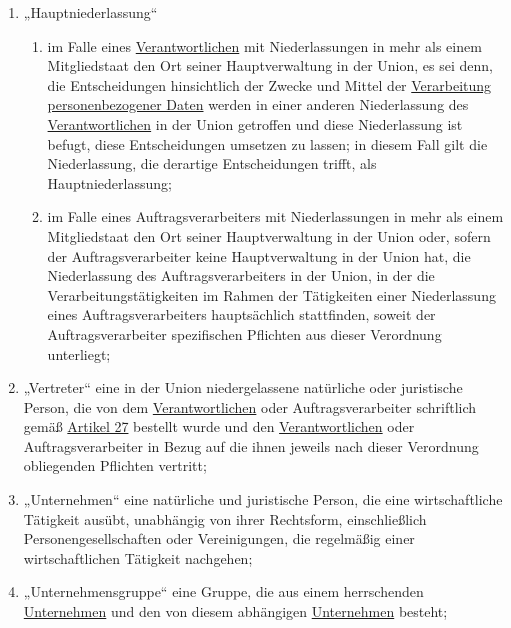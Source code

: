 \begin{enumerate}
  \item „Hauptniederlassung“
  \label{itm:04-16}

  \begin{enumerate}
  
    \item im Falle eines \hyperref[itm:04-7]{Verantwortlichen} mit Niederlassungen in mehr als einem Mitgliedstaat den Ort seiner
     Hauptverwaltung in der Union, es sei denn, die Entscheidungen hinsichtlich der Zwecke und Mittel der \hyperref[itm:04-2]{Verarbeitung}
     \hyperref[itm:04-1]{personenbezogener Daten} werden in einer anderen Niederlassung des \hyperref[itm:04-7]{Verantwortlichen} in der Union getroffen und
     diese Niederlassung ist befugt, diese Entscheidungen umsetzen zu lassen; in diesem Fall gilt die Niederlassung,
     die derartige Entscheidungen trifft, als Hauptniederlassung;
    \label{itm:04-16a}

    \item im Falle eines Auftragsverarbeiters mit Niederlassungen in mehr als einem Mitgliedstaat den Ort seiner
     Hauptverwaltung in der Union oder, sofern der Auftragsverarbeiter keine Hauptverwaltung in der Union hat, die
     Niederlassung des Auftragsverarbeiters in der Union, in der die Verarbeitungstätigkeiten im Rahmen der Tätigkeiten
     einer Niederlassung eines Auftragsverarbeiters hauptsächlich stattfinden, soweit der Auftragsverarbeiter
     spezifischen Pflichten aus dieser Verordnung unterliegt;
    \label{itm:04-16b}

  \end{enumerate}

  \item „Vertreter“ eine in der Union niedergelassene natürliche oder juristische Person, die von dem \hyperref[itm:04-7]{Verantwortlichen}
   oder Auftragsverarbeiter schriftlich gemäß \hyperref[ch:27]{Artikel 27} bestellt wurde und den \hyperref[itm:04-7]{Verantwortlichen} oder
   Auftragsverarbeiter in Bezug auf die ihnen jeweils nach dieser Verordnung obliegenden Pflichten vertritt;
  \label{itm:04-17}

  \item „Unternehmen“ eine natürliche und juristische Person, die eine wirtschaftliche Tätigkeit ausübt, unabhängig von
   ihrer Rechtsform, einschließlich Personengesellschaften oder Vereinigungen, die regelmäßig einer wirtschaftlichen
   Tätigkeit nachgehen;
  \label{itm:04-18}

  \item „Unternehmensgruppe“ eine Gruppe, die aus einem herrschenden \hyperref[itm:04-18]{Unternehmen} und den von diesem abhängigen
   \hyperref[itm:04-18]{Unternehmen} besteht;
  \label{itm:04-19}


\end{enumerate}

